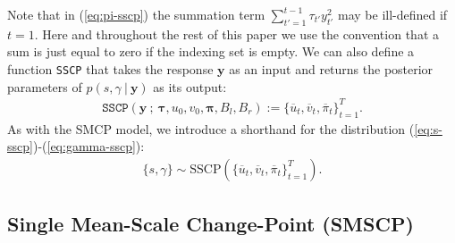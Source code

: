 Note that in (\ref{eq:pi-sscp}) the summation term $\sum_{t'=1}^{t-1} \tau_{t'}y_{t'}^2$ may be ill-defined if $t = 1$. Here and throughout the rest of this paper we use the convention that a sum is just equal to zero if the indexing set is empty. We can also define a function \texttt{SSCP} that takes the response $\mathbf{y}$ as an input and returns the posterior parameters of $p(s, \gamma\:|\:\mathbf{y})$ as its output: 
\begin{align}
    \texttt{SSCP}\left(\mathbf{y} \:;\: \pmb{\tau}, u_0, v_0, \pmb{\pi}, B_l, B_r\right) := \{\overline{u}_t, \overline{v}_t, \overline{\pi}_t\}_{t=1}^T.
\end{align}
As with the SMCP model, we introduce a shorthand for the distribution (\ref{eq:s-sscp})-(\ref{eq:gamma-sscp}): 
\begin{align}
    \{s,\gamma\} \sim \text{SSCP}(\{\overline{u}_t, \overline{v}_t, \overline{\pi}_t\}_{t=1}^T).
\end{align}

\subsection{Single Mean-Scale Change-Point (SMSCP)}
\label{sec:smscp}

